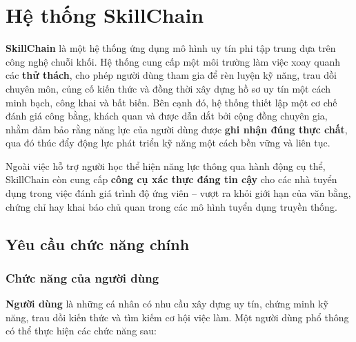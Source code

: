 \chapter{Hệ thống SkillChain}

\textbf{SkillChain} là một hệ thống ứng dụng mô hình uy tín phi tập trung dựa trên công nghệ chuỗi khối. Hệ thống cung cấp một môi trường làm việc xoay quanh các \textbf{thử thách}, cho phép người dùng tham gia để rèn luyện kỹ năng, trau dồi chuyên môn, củng cố kiến thức và đồng thời xây dựng hồ sơ uy tín một cách minh bạch, công khai và bất biến.
Bên cạnh đó, hệ thống thiết lập một cơ chế đánh giá công bằng, khách quan và được dẫn dắt bởi cộng đồng chuyên gia, nhằm đảm bảo rằng năng lực của người dùng được \textbf{ghi nhận đúng thực chất}, qua đó thúc đẩy động lực phát triển kỹ năng một cách bền vững và liên tục.

Ngoài việc hỗ trợ người học thể hiện năng lực thông qua hành động cụ thể, SkillChain còn cung cấp \textbf{công cụ xác thực đáng tin cậy} cho các nhà tuyển dụng trong việc đánh giá trình độ ứng viên --
vượt ra khỏi giới hạn của văn bằng, chứng chỉ hay khai báo chủ quan trong các mô hình tuyển dụng truyền thống.

\section{Yêu cầu chức năng chính}

\subsection{Chức năng của người dùng}

\textbf{Người dùng} là những cá nhân có nhu cầu xây dựng uy tín, chứng minh kỹ năng, trau dồi kiến thức và tìm kiếm cơ hội việc làm.
Một người dùng phổ thông có thể thực hiện các chức năng sau:

